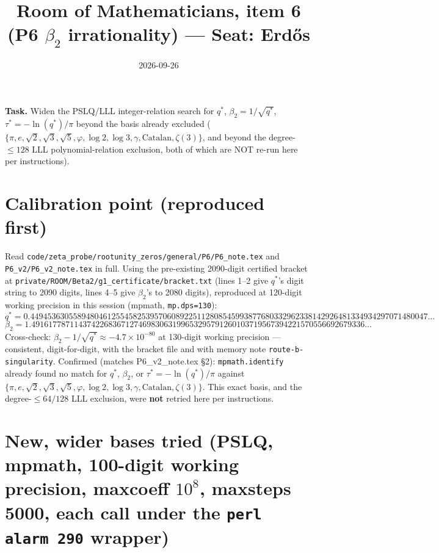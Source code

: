 \documentclass[11pt]{article}
\title{Room of Mathematicians, item 6 (P6 $\beta_2$ irrationality) --- Seat: Erd\H{o}s}
\author{}
\date{2026-09-26}
\begin{document}
\maketitle

\noindent\textbf{Task.} Widen the PSLQ/LLL integer-relation search for $q^\ast$, $\beta_2=1/\sqrt{q^\ast}$,
$\tau^\ast=-\ln(q^\ast)/\pi$ beyond the basis already excluded
($\{\pi,e,\sqrt2,\sqrt3,\sqrt5,\varphi,\log2,\log3,\gamma,\text{Catalan},\zeta(3)\}$, and beyond
the degree-$\le128$ LLL polynomial-relation exclusion, both of which are NOT re-run here per
instructions).

\section{Calibration point (reproduced first)}

Read \texttt{code/zeta\_probe/rootunity\_zeros/general/P6/P6\_note.tex} and
\texttt{P6\_v2/P6\_v2\_note.tex} in full. Using the pre-existing 2090-digit certified bracket at
\texttt{private/ROOM/Beta2/g1\_certificate/bracket.txt} (lines 1--2 give $q^\ast$'s digit string to
2090 digits, lines 4--5 give $\beta_2$'s to 2080 digits), reproduced at 120-digit working precision
in this session (mpmath, \texttt{mp.dps=130}):
\[
q^\ast = 0.449453630558948046125545825395706089225112808545993877680332962338142926481334934297071480047\ldots
\]
\[
\beta_2 = 1.491617787114374226836712746983063199653295791260103719567394221570556692679336\ldots
\]
Cross-check: $\beta_2 - 1/\sqrt{q^\ast} \approx -4.7\times10^{-80}$ at 130-digit working
precision --- consistent, digit-for-digit, with the bracket file and with memory note
\texttt{route-b-singularity}. Confirmed (matches P6\_v2\_note.tex \S2): \texttt{mpmath.identify}
already found no match for $q^\ast$, $\beta_2$, or $\tau^\ast=-\ln(q^\ast)/\pi$ against
$\{\pi,e,\sqrt2,\sqrt3,\sqrt5,\varphi,\log2,\log3,\gamma,\text{Catalan},\zeta(3)\}$. This exact
basis, and the degree-$\le64/128$ LLL exclusion, were \textbf{not} retried here per instructions.

\section{New, wider bases tried (PSLQ, mpmath, 100-digit working precision, maxcoeff $10^8$,
maxsteps 5000, each call under the \texttt{perl alarm 290} wrapper)}
\end{document}
